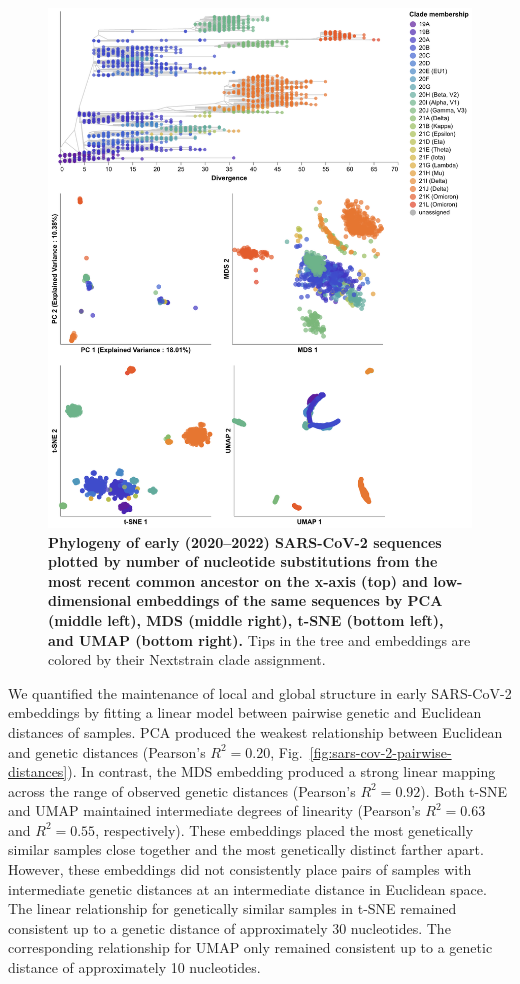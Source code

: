 \documentclass[10pt,letterpaper]{article}
\begin{document}
\begin{figure}[!h]
\includegraphics[width=\columnwidth]{figures/sarscov2-embeddings-by-Nextstrain_clade-clade.png}
\caption{{\bf Phylogeny of early (2020--2022) SARS-CoV-2 sequences plotted by number of nucleotide substitutions from the most recent common ancestor on the x-axis (top) and low-dimensional embeddings of the same sequences by PCA (middle left), MDS (middle right), t-SNE (bottom left), and UMAP (bottom right).}
  Tips in the tree and embeddings are colored by their Nextstrain clade assignment.
}
\label{fig:sars-cov-2-early-embeddings-by-Nextstrain-clade}
\end{figure}

We quantified the maintenance of local and global structure in early SARS-CoV-2 embeddings by fitting a linear model between pairwise genetic and Euclidean distances of samples.
PCA produced the weakest relationship between Euclidean and genetic distances (Pearson's $R^{2}=0.20$, Fig.~\ref{fig:sars-cov-2-pairwise-distances}).
In contrast, the MDS embedding produced a strong linear mapping across the range of observed genetic distances (Pearson's $R^{2}=0.92$).
Both t-SNE and UMAP maintained intermediate degrees of linearity (Pearson's $R^{2}=0.63$ and $R^{2}=0.55$, respectively).
These embeddings placed the most genetically similar samples close together and the most genetically distinct farther apart.
However, these embeddings did not consistently place pairs of samples with intermediate genetic distances at an intermediate distance in Euclidean space.
The linear relationship for genetically similar samples in t-SNE remained consistent up to a genetic distance of approximately 30 nucleotides.
The corresponding relationship for UMAP only remained consistent up to a genetic distance of approximately 10 nucleotides.
\end{document}
